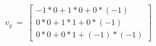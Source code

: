 \documentclass[preview]{standalone}
\begin{document}
\begin{align*}
v_y\ =\ \begin{bmatrix}
                        -1*0+1*0+0*(-1)\\
                        0*0+1*1+0*(-1)\\
                        0*0+0*1+(-1)*(-1)
                        \end{bmatrix}\\
\end{align*}
\end{document}
